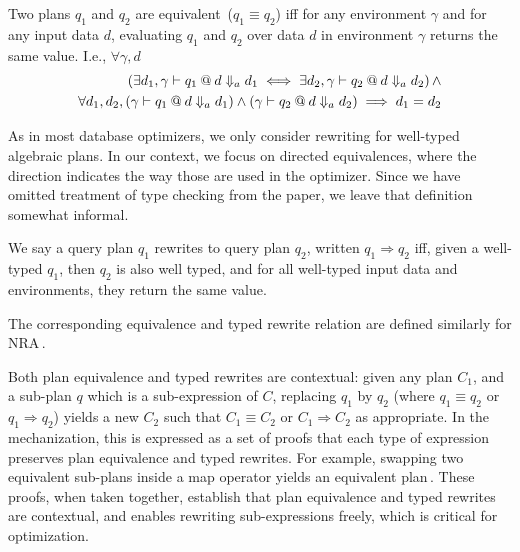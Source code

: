 \begin{definition}
\label{def:nraenv-equiv}
  Two plans $q_1$ and $q_2$ are equivalent~($q_1 \equiv q_2$) iff for any environment
  $\gamma$ and for any input data $d$, evaluating $q_1$ and $q_2$ over
  data $d$ in environment $\gamma$ returns the same value. I.e., $\forall \gamma, d$
  \begin{align*}
    \left(\exists{d_1},\gamma \vdash q_1 \:@\: d \Downarrow_a d_1
    \iff \exists{d_2}, \gamma \vdash q_2 \:@\: d \Downarrow_a d_2\right)
  \wedge
  \\
  \forall{ d_1, d_2},
    \left(\gamma \vdash q_1 \:@\: d \Downarrow_a d_1\right) \wedge \left(\gamma \vdash q_2 \:@\: d \Downarrow_a d_2\right) \implies d_1 = d_2
  \end{align*}
\end{definition}
As in most database optimizers, we only consider rewriting for
well-typed algebraic plans. In our context, we focus on directed
equivalences, where the direction indicates the way those are used in
the optimizer. Since we have omitted treatment of type checking from
the paper, we leave that definition somewhat informal.

\begin{definition}
  We say a query plan $q_1$ rewrites to query plan $q_2$,
  written $q_1 \Rightarrow q_2$ iff, given a well-typed $q_1$, then
  $q_2$ is also well typed, and for all well-typed input data and
  environments, they return the same value.
\end{definition}

The corresponding equivalence and typed rewrite relation are defined similarly
for NRA\,.

Both plan equivalence and typed rewrites are contextual: given any
plan $C_1$, and a sub-plan $q$ which is a sub-expression of $C$,
replacing $q_1$ by $q_2$ (where $q_1 \equiv q_2$ or $q_1 \Rightarrow
q_2$) yields a new $C_2$ such that $C_1 \equiv C_2$ or $C_1
\Rightarrow C_2$ as appropriate. In the mechanization, this is
expressed as a set of proofs that each type of expression preserves
plan equivalence and typed rewrites.  For example, swapping two
equivalent sub-plans inside a map operator yields an equivalent
plan\,.
These proofs, when taken together, establish that plan equivalence and
typed rewrites are contextual, and enables rewriting sub-expressions
freely, which is critical for optimization.

